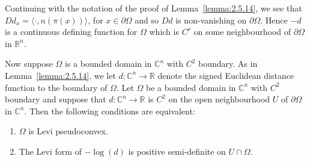 Continuing with the notation of the proof of Lemma~\ref{lemma:2.5.14}, we see that $Dd_x=\langle\cdot,n(\pi(x))\rangle$, for $x\in\partial\Omega$ and so $Dd$ is non-vanishing on $\partial\Omega$. Hence $-d$ is a continuous defining function for $\Omega$ which is $C^r$ on some neighbourhood of $\partial\Omega$ in $\mathbb R^n$.

Now suppose $\Omega$ is a bounded domain in $\mathbb C^n$ with $C^2$ boundary. As in Lemma~\ref{lemma:2.5.14}, we let $d:\mathbb C^n\to\mathbb R$ denote the signed Euclidean distance function to the boundary of $\Omega$.
 Let $\Omega$ be a bounded domain in $\mathbb C^n$ with $C^2$ boundary and suppose that $d:\mathbb C^n\to\mathbb R$ is $C^2$ on the open neighbourhood $U$ of $\partial\Omega$ in $\mathbb C^n$. Then the following conditions are equivalent:
\begin{enumerate}
\item[i)] $\Omega$ is Levi pseudoconvex.
\item[ii)] The Levi form of $-\log(d)$ is positive semi-definite on $U\cap\Omega$.
\end{enumerate}
